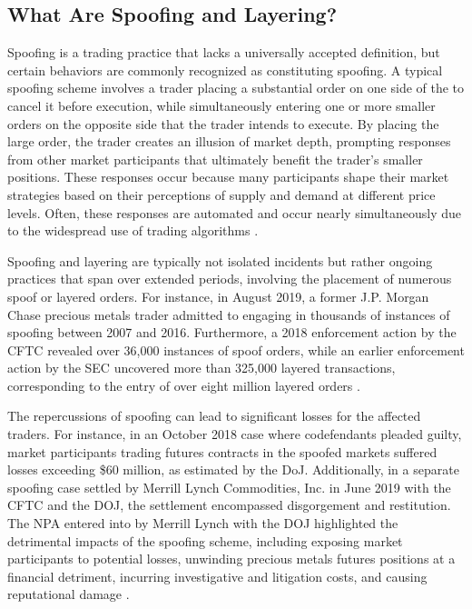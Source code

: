 \subsection{What Are Spoofing and Layering?}
Spoofing is a trading practice that lacks a universally accepted definition, but certain behaviors are commonly recognized as constituting spoofing. A typical spoofing scheme involves a trader placing a substantial order on one side of the to cancel it before execution, while simultaneously entering one or more smaller orders on the opposite side that the trader intends to execute. By placing the large order, the trader creates an illusion of market depth, prompting responses from other market participants that ultimately benefit the trader's smaller positions. These responses occur because many participants shape their market strategies based on their perceptions of supply and demand at different price levels. Often, these responses are automated and occur nearly simultaneously due to the widespread use of trading algorithms \cite{corwin2012large, jarrow2011manipulation}.

Spoofing and layering are typically not isolated incidents but rather ongoing practices that span over extended periods, involving the placement of numerous spoof or layered orders. For instance, in August 2019, a former J.P. Morgan Chase precious metals trader admitted to engaging in thousands of instances of spoofing between 2007 and 2016. Furthermore, a 2018 enforcement action by the CFTC revealed over 36,000 instances of spoof orders, while an earlier enforcement action by the SEC uncovered more than 325,000 layered transactions, corresponding to the entry of over eight million layered orders \cite{cftc2018spoofing, sec2015spoofing}.

The repercussions of spoofing can lead to significant losses for the affected traders. For instance, in an October 2018 case where codefendants pleaded guilty, market participants trading futures contracts in the spoofed markets suffered losses exceeding \$60 million, as estimated by the DoJ. Additionally, in a separate spoofing case settled by Merrill Lynch Commodities, Inc. in June 2019 with the CFTC and the DOJ, the settlement encompassed disgorgement and restitution. The NPA entered into by Merrill Lynch with the DOJ highlighted the detrimental impacts of the spoofing scheme, including exposing market participants to potential losses, unwinding precious metals futures positions at a financial detriment, incurring investigative and litigation costs, and causing reputational damage \cite{doj2018spoofing, cftc2019merrill}.

